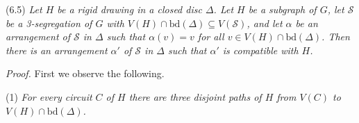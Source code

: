 \stmt
(6.5) \textit{Let $H$ be a rigid drawing in a closed disc $\Delta$. Let $H$ be a subgraph of $G$, let $\mathscr{S}$ be a 3-segregation of $G$ with $V(H) \cap \text{bd}(\Delta) \subseteq V(\mathscr{S})$, and let $\alpha$ be an arrangement of $\mathscr{S}$ in $\Delta$ such that $\alpha(v) = v$ for all $v \in V(H) \cap \text{bd}(\Delta)$. Then there is an arrangement $\alpha'$ of $\mathscr{S}$ in $\Delta$ such that $\alpha'$ is compatible with $H$.}

\textit{Proof.} First we observe the following.

\hspace*{12pt}(1) \textit{For every circuit $C$ of $H$ there are three disjoint paths of $H$ from $V(C)$ to $V(H) \cap \text{bd}(\Delta)$.}
